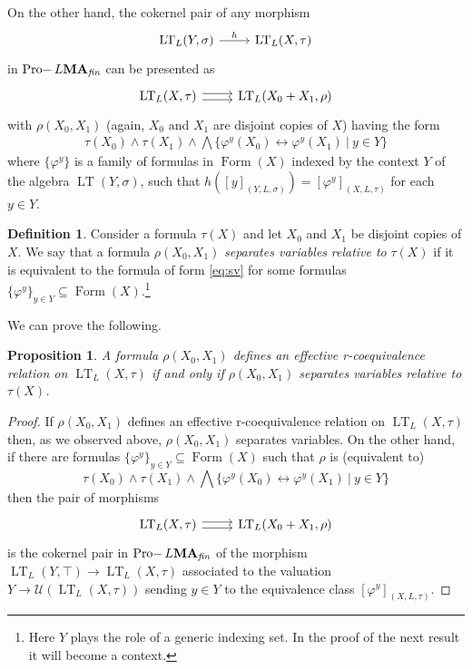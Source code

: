 \documentclass{article}
\newcommand{\blue}[1]{{\color{blue} #1}}
\newtheorem{prop}{Proposition}
\theoremstyle{definition}
\newtheorem{defn}{Definition}
\DeclareMathOperator{\LT}{LT}
\DeclareMathOperator{\Formulas}{Form}
\DeclareMathOperator{\Pro}{Pro-}
\newcommand{\MA}{\textup{\textbf{MA}}}
\newcommand{\fin}{\textit{fin}}
\begin{document}
On the other hand, the cokernel pair  of any morphism
\[\begin{tikzcd}[ampersand replacement=\&]
	{\LT_L(Y,\sigma)} \& {\LT_L(X,\tau)}
	\arrow["h", from=1-1, to=1-2]
\end{tikzcd}\]
in $\Pro L\MA_\fin$ can be presented as
\[\begin{tikzcd}[ampersand replacement=\&]
	{\LT_L(X,\tau)} \& {\LT_L(X_0+X_1,\rho)}
	\arrow[shift left, from=1-1, to=1-2]
	\arrow[shift right, from=1-1, to=1-2]
\end{tikzcd}\]
with $\rho(X_0,X_1)$ (again, $X_0$ and $X_1$ are disjoint copies of $X$) having the form
\begin{align*}\label{eq:sv}
\tau(X_0) \wedge \tau(X_1) \wedge \bigwedge\{\varphi^y(X_0) \leftrightarrow \varphi^y(X_1)\ \vert\ y \in Y\}\tag{SV}
\end{align*}
where $\{\varphi^y\}$ is a family of formulas in $\Formulas(X)$ indexed by the context $Y$ of the algebra %
$\LT(Y,\sigma)$, such that $h([y]_{(Y,L,\sigma)}) = [\varphi^y]_{(X,L,\tau)}$ for each $y \in Y$.

\begin{defn}
Consider a formula $\tau(X)$ and let $X_0$ and $X_1$ be disjoint copies of $X$. We say that a formula $\rho(X_0,X_1)$ \emph{separates variables} %
\emph{relative to} $\tau(X)$ if it is equivalent to the formula of form \cref{eq:sv} for some formulas $\{\varphi^y\}_{y \in Y} \subseteq \Formulas(X)$.\footnote{Here $Y$ plays the role of a generic indexing set. In the proof of the next result it will become a context.}
\end{defn}

We can prove the following.
\begin{prop}
A formula $\rho(X_0,X_1)$ defines an effective r-coequivalence relation on $\LT_L(X,\tau)$ if and only if $\rho(X_0,X_1)$ separates variables %
relative to $\tau(X)$.
\end{prop}
\begin{proof}
If $\rho(X_0,X_1)$ defines an effective r-coequivalence relation on $\LT_L(X,\tau)$ then, as we observed above, $\rho(X_0,X_1)$ separates variables. On the other hand, if there are formulas $\{\varphi^y\}_{y \in Y} \subseteq \Formulas(X)$ such that $\rho$ is (equivalent to)
$$\tau(X_0) \wedge \tau(X_1) \wedge \bigwedge\{\varphi^y(X_0) \leftrightarrow \varphi^y(X_1)\ \vert\ y \in Y\}$$
then the pair of morphisms
\[\begin{tikzcd}[ampersand replacement=\&]
	{\LT_L(X,\tau)} \& {\LT_L(X_0+X_1,\rho)}
	\arrow[shift left, from=1-1, to=1-2]
	\arrow[shift right, from=1-1, to=1-2]
\end{tikzcd}\]
is the cokernel pair in $\Pro L\MA_\fin$ of the morphism $\LT_L(Y,\top) \longrightarrow \LT_L(X,\tau)$ associated to the valuation $Y \longrightarrow \mathcal{U}(\LT_L(X,\tau))$ sending $y \in Y$ to the equivalence class $[\varphi^y]_{(X,L,\tau)}$.
\end{proof}
\end{document}
